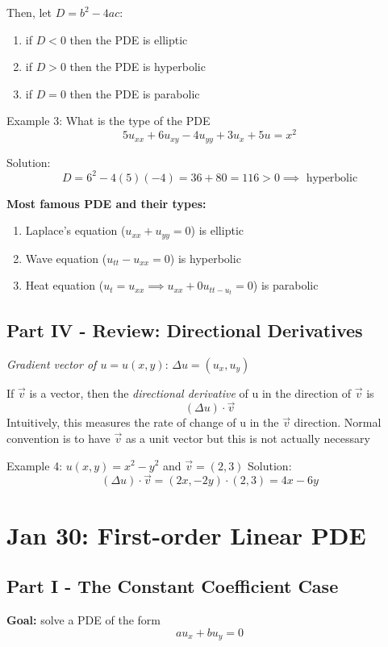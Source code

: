 \documentclass[12pt]{article}
\begin{document}
Then, let $D = b^2 - 4ac$:
\begin{enumerate}
    \item if $D < 0$ then the PDE is elliptic
    \item if $D > 0$ then the PDE is hyperbolic
    \item if $D = 0$ then the PDE is parabolic
\end{enumerate}

Example 3: What is the type of the PDE
\[5u_{xx} + 6u_{xy} - 4u_{yy} + 3u_x + 5u = x^2\]

Solution:
\[D = 6^2 - 4(5)(-4) = 36 + 80 = 116 > 0 \implies \boxed{\text{  hyperbolic}}\]

\textbf{Most famous PDE and their types:}
\begin{enumerate}
    \item Laplace's equation ($u_{xx} + u_{yy} = 0$) is elliptic
    \item Wave equation ($u_{tt} - u_{xx} = 0$) is hyperbolic
    \item Heat equation ($u_t = u_{xx} \implies u_{xx} + 0u_{tt - u_t} = 0$) is parabolic 
\end{enumerate}

\subsection*{Part IV - Review: Directional Derivatives}
\emph{Gradient vector of $u= u(x, y)$}: $\Delta u = (u_x, u_y)$

If $\vec{v}$ is a vector, then the \emph{directional derivative} of u in the direction of $\vec{v}$ is
\[(\Delta u)\cdot \vec{v}\]
Intuitively, this measures the rate of change of u in the $\vec{v}$ direction. Normal convention is to have $\vec{v}$ as a unit vector but this is not actually necessary

Example 4: $u(x, y) = x^2 - y^2$ and $\vec{v} = (2,3)$
Solution:
\[(\Delta u)\cdot \vec{v} = (2x, -2y) \cdot (2, 3) = \boxed{4x-6y}\]

\section{Jan 30: First-order Linear PDE}
\subsection*{Part I - The Constant Coefficient Case}
\textbf{Goal:} solve a PDE of the form 
\[au_x + bu_y = 0\]
\end{document}
